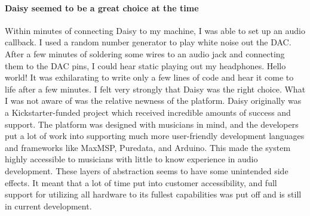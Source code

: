 \documentclass[acmlarge,screen]{acmart}
\begin{document}
	\paragraph{Daisy seemed to be a great choice at the time} Within minutes of connecting Daisy to my machine, I was able to set up an audio callback. I used a random number generator to play white noise out the DAC. After a few minutes of soldering some wires to an audio jack and connecting them to the DAC pins, I could hear static playing out my headphones. Hello world! It was exhilarating to write only a few lines of code and hear it come to life after a few minutes. I felt very strongly that Daisy was the right choice. What I was not aware of was the relative newness of the platform. Daisy originally was a Kickstarter-funded project which received incredible amounts of success and support. The platform was designed with musicians in mind, and the developers put a lot of work into supporting much more user-friendly development languages and frameworks like MaxMSP, Puredata, and Arduino. This made the system highly accessible to musicians with little to know experience in audio development. These layers of abstraction seems to have some unintended side effects. It meant that a lot of time put into customer accessibility, and full support for utilizing all hardware to its fullest capabilities was put off and is still in current development.
\end{document}
